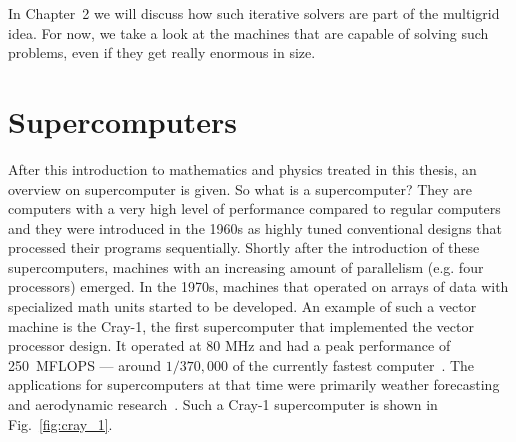 In Chapter~2 we will discuss how such iterative solvers are part of the multigrid idea. For now, we take a look at the machines that are capable of solving such problems, even if they get really enormous in size.



\section{Supercomputers}

After this introduction to mathematics and physics treated in this thesis, an overview on supercomputer is given. So what is a supercomputer? They are computers with a very high level of performance compared to regular computers and they were introduced in the 1960s as highly tuned conventional designs that processed their programs sequentially. Shortly after the introduction of these supercomputers, machines with an increasing amount of parallelism (e.g. four processors) emerged. In the 1970s, machines that operated on arrays of data with specialized math units started to be developed. An example of such a vector machine is the Cray-1, the first supercomputer that implemented the vector processor design. It operated at 80 MHz and had a peak performance of 250~MFLOPS --- around $1/370,000$ of the currently fastest computer~\cite{russell1978cray,top500sunway}. The applications for supercomputers at that time were primarily weather forecasting and aerodynamic research~\cite{russell1978cray}. Such a Cray-1 supercomputer is shown in Fig.~\ref{fig:cray_1}.

